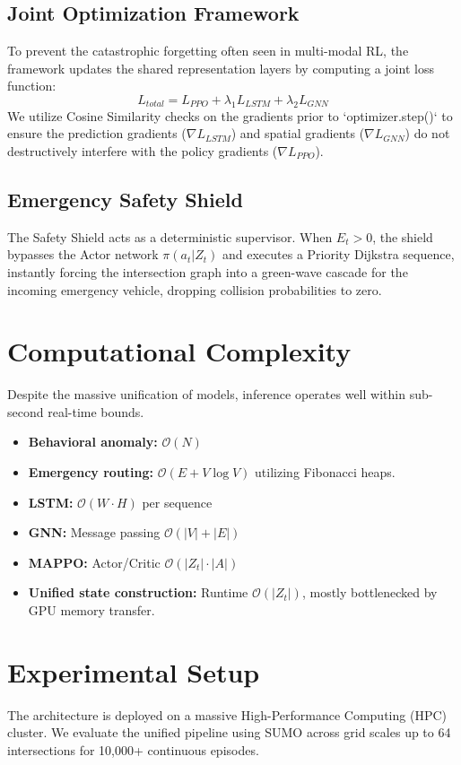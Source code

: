\documentclass{ieeeaccess}
\begin{document}
\subsection{Joint Optimization Framework}
To prevent the catastrophic forgetting often seen in multi-modal RL, the framework updates the shared representation layers by computing a joint loss function:
$$L_{total} = L_{PPO} + \lambda_1 L_{LSTM} + \lambda_2 L_{GNN}$$
We utilize Cosine Similarity checks on the gradients prior to `optimizer.step()` to ensure the prediction gradients ($\nabla L_{LSTM}$) and spatial gradients ($\nabla L_{GNN}$) do not destructively interfere with the policy gradients ($\nabla L_{PPO}$).

\subsection{Emergency Safety Shield}
The Safety Shield acts as a deterministic supervisor. When $E_t > 0$, the shield bypasses the Actor network $\pi(a_t|Z_t)$ and executes a Priority Dijkstra sequence, instantly forcing the intersection graph into a green-wave cascade for the incoming emergency vehicle, dropping collision probabilities to zero.

\section{Computational Complexity}
\label{sec:complexity}
Despite the massive unification of models, inference operates well within sub-second real-time bounds.
\begin{itemize}
    \item \textbf{Behavioral anomaly:} $\mathcal{O}(N)$
    \item \textbf{Emergency routing:} $\mathcal{O}(E + V \log V)$ utilizing Fibonacci heaps.
    \item \textbf{LSTM:} $\mathcal{O}(W \cdot H)$ per sequence
    \item \textbf{GNN:} Message passing $\mathcal{O}(|V| + |E|)$
    \item \textbf{MAPPO:} Actor/Critic $\mathcal{O}(|Z_t| \cdot |A|)$
    \item \textbf{Unified state construction:} Runtime $\mathcal{O}(|Z_t|)$, mostly bottlenecked by GPU memory transfer.
\end{itemize}

\section{Experimental Setup}
\label{sec:experimental_setup}
The architecture is deployed on a massive High-Performance Computing (HPC) cluster. We evaluate the unified pipeline using SUMO across grid scales up to 64 intersections for 10,000+ continuous episodes. 
\end{document}
